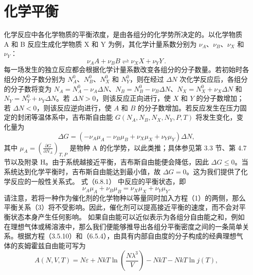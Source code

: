 \section{化学平衡}\label{ux5316ux5b66ux5e73ux8861}
化学反应中各化学物质的平衡浓度，是由各组分的化学势所决定的。以化学物质 A 和 B 反应生成化学物质 X 和 Y 为例，其化学计量系数分别为 \(\nu_A\)、\(\nu_B\)、\(\nu_X\) 和 \(\nu_Y\)：
\begin{equation}\tag{6.6.1}\label{eq:6.6.1}
\nu _ { A } A + \nu _ { B } B \rightleftharpoons \nu _ { X } X + \nu _ { Y } Y \, .
\end{equation}
每一场发生的独立反应都会根据化学计量系数改变各组分的分子数量。若初始时各组分的分子数分别为 \(N_{A}^{0}\)、\(N_{B}^{0}\)、\(N_{X}^{0}\) 和 \(N_{Y}^{0}\)，则在经过 \(\Delta N\) 次化学反应后，各组分的分子数将变为 \(N_{A}=N_{A}^{0}-\nu_{A}\Delta N\)、\(N_{B}=N_{B}^{0}-\nu_{B}\Delta N\)、\(N_{X}=N_{X}^{0}+\nu_{X}\Delta N\) 和 \(N_{Y}=N_{Y}^{0}+\nu_{Y}\Delta N\)。若 \(\Delta N>0\)，则该反应正向进行，使 \(X\) 和 \(Y\) 的分子数增加；若 \(\Delta N<0\)，则该反应逆向进行，使 \(A\) 和 \(B\) 的分子数增加。若反应发生在压力固定的封闭等温体系中，吉布斯自由能 \(G(N_{A},N_{B},N_{X},N_{Y},P,T)\) 将发生变化，变化量为
\begin{equation}\tag{6.6.2}\label{eq:6.6.2}
\Delta G = ( - \nu _ { A } \mu _ { A } - \nu _ { B } \mu _ { B } + \nu _ { X } \mu _ { X } + \nu _ { Y } \mu _ { Y } ) \Delta N ,
\end{equation}
其中 \(\mu_{A}=\left(\frac{\partial G}{\partial N_{A}}\right)_{T, P}\) 是物种 A 的化学势，以此类推；具体参见第 3.3 节、第 4.7 节以及附录 H。由于系统越接近平衡，吉布斯自由能便会降低，因此 \(\Delta G \leq 0\)。当系统达到化学平衡时，吉布斯自由能达到最小值，故 \(\Delta G=0\)。这为我们提供了化学反应的一般性关系式。
式（6.8.1） 中反应的平衡状态，即
\begin{equation}\tag{6.6.3}\label{eq:6.6.3}
\nu _ { A } \mu _ { A } + \nu _ { B } \mu _ { B } = \nu _ { X } \mu _ { X } + \nu _ { Y } \mu _ { Y } .
\end{equation}
请注意，若将一种作为催化剂的化学物种以等量同时加入方程（1）的两侧，那么平衡关系（3）将不受影响。因此，催化剂可以提高接近平衡的速度，而不会对平衡状态本身产生任何影响。
如果自由能可以近似表示为各组分自由能之和，例如在理想气体或稀溶液中，那么我们便能够推导出各组分平衡密度之间的一条简单关系。根据方程（3.5.10）和（6.5.4），由具有内部自由度的分子构成的经典理想气体的亥姆霍兹自由能可写为
\begin{equation}\tag{6.6.4}\label{eq:6.6.4}
A ( N , V , T ) = N \varepsilon + N k T \ln \left( \frac { N \lambda ^{3} } { V } \right) - N k T - N k T \ln j ( T ) ,
\end{equation}
